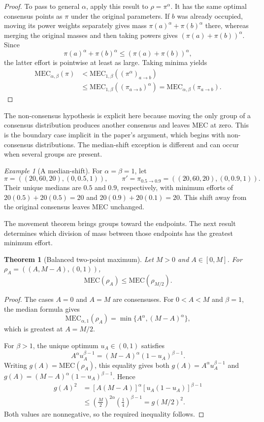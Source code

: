 \documentclass{article}
\theoremstyle{plain}
\newtheorem{theorem}{Theorem}
\theoremstyle{remark}
\newtheorem{example}{Example}
\begin{document}
\begin{proof}
To pass to general $\alpha$, apply this result to $\rho=\pi^\alpha$. It has the same optimal consensus points as $\pi$ under the original parameters. If $b$ was already occupied, moving its power weights separately gives mass $\pi(a)^\alpha+\pi(b)^\alpha$ there, whereas merging the original masses and then taking powers gives $(\pi(a)+\pi(b))^\alpha$. Since
\[
\pi(a)^\alpha+\pi(b)^\alpha\leq(\pi(a)+\pi(b))^\alpha,
\]
the latter effort is pointwise at least as large. Taking minima yields
\[
\begin{aligned}
\mathrm{MEC}_{\alpha,\beta}(\pi)
&<\mathrm{MEC}_{1,\beta}((\pi^\alpha)_{a\to b})\\
&\leq\mathrm{MEC}_{1,\beta}((\pi_{a\to b})^\alpha)
=\mathrm{MEC}_{\alpha,\beta}(\pi_{a\to b}).
\end{aligned}
\]
\end{proof}

The non-consensus hypothesis is explicit here because moving the only group of a consensus distribution produces another consensus and leaves MEC at zero. This is the boundary case implicit in the paper's argument, which begins with non-consensus distributions. The median-shift exception is different and can occur when several groups are present.

\begin{example}[A median-shift]\label{ex:mec-median-shift}
For $\alpha=\beta=1$, let
\[
\pi=((20,60,20),(0,0.5,1)),\qquad
\pi'=\pi_{0.5\to0.9}=((20,60,20),(0,0.9,1)).
\]
Their unique medians are $0.5$ and $0.9$, respectively, with minimum efforts of $20(0.5)+20(0.5)=20$ and $20(0.9)+20(0.1)=20$. This shift away from the original consensus leaves MEC unchanged.
\end{example}

The movement theorem brings groups toward the endpoints. The next result determines which division of mass between those endpoints has the greatest minimum effort.

\begin{theorem}[Balanced two-point maximum]\label{th:mec-two-point-maximum}
Let $M>0$ and $A\in[0,M]$. For $\rho_A=((A,M-A),(0,1))$,
\[
\mathrm{MEC}(\rho_A)\leq\mathrm{MEC}(\rho_{M/2}).
\]
\end{theorem}
\begin{proof}
The cases $A=0$ and $A=M$ are consensuses. For $0<A<M$ and $\beta=1$, the median formula gives
\[
\mathrm{MEC}_{\alpha,1}(\rho_A)=\min\{A^\alpha,(M-A)^\alpha\},
\]
which is greatest at $A=M/2$.

For $\beta>1$, the unique optimum $u_A\in(0,1)$ satisfies
\[
A^\alpha u_A^{\beta-1}=(M-A)^\alpha(1-u_A)^{\beta-1}.
\]
Writing $g(A)=\mathrm{MEC}(\rho_A)$, this equality gives both $g(A)=A^\alpha u_A^{\beta-1}$ and $g(A)=(M-A)^\alpha(1-u_A)^{\beta-1}$. Hence
\[
\begin{aligned}
g(A)^2
&=[A(M-A)]^\alpha[u_A(1-u_A)]^{\beta-1}\\
&\leq\left(\frac{M}{2}\right)^{2\alpha}
       \left(\frac14\right)^{\beta-1}
=g(M/2)^2.
\end{aligned}
\]
Both values are nonnegative, so the required inequality follows.
\end{proof}
\end{document}
